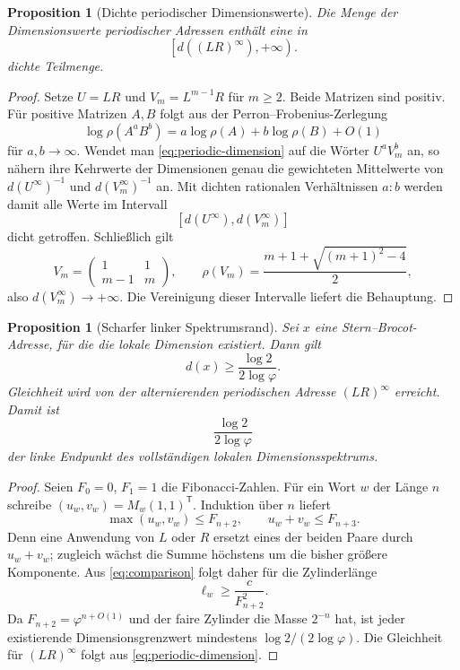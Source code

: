 \documentclass[11pt,a4paper]{article}
\newtheorem{proposition}[remark]{Proposition}
\begin{document}
\begin{proposition}[Dichte periodischer Dimensionswerte]
Die Menge der Dimensionswerte periodischer Adressen enthält eine in
\[
 \left[d((LR)^\infty),+\infty\right).
\]
dichte Teilmenge.
\end{proposition}

\begin{proof}
Setze $U=LR$ und $V_m=L^{m-1}R$ für $m\ge2$. Beide Matrizen sind positiv.
Für positive Matrizen $A,B$ folgt aus der Perron--Frobenius-Zerlegung
\[
 \log\rho(A^aB^b)
 =a\log\rho(A)+b\log\rho(B)+O(1)
\]
für $a,b\to\infty$. Wendet man \eqref{eq:periodic-dimension} auf die
Wörter $U^aV_m^b$ an, so nähern ihre Kehrwerte der Dimensionen genau die
gewichteten Mittelwerte von $d(U^\infty)^{-1}$ und
$d(V_m^\infty)^{-1}$ an. Mit dichten rationalen Verhältnissen $a:b$
werden damit alle Werte im Intervall
\[
 [d(U^\infty),d(V_m^\infty)]
\]
dicht getroffen. Schließlich gilt
\[
 V_m=\begin{pmatrix}1&1\\m-1&m\end{pmatrix},
 \qquad
 \rho(V_m)
 =\frac{m+1+\sqrt{(m+1)^2-4}}2,
\]
also $d(V_m^\infty)\to+\infty$. Die Vereinigung dieser Intervalle liefert
die Behauptung.
\end{proof}

\begin{proposition}[Scharfer linker Spektrumsrand]
Sei $x$ eine Stern--Brocot-Adresse, für die die lokale Dimension existiert.
Dann gilt
\[
 d(x)\ge \frac{\log2}{2\log\varphi}.
\]
Gleichheit wird von der alternierenden periodischen Adresse
$(LR)^\infty$ erreicht. Damit ist
\[
 \frac{\log2}{2\log\varphi}
\]
der linke Endpunkt des vollständigen lokalen Dimensionsspektrums.
\end{proposition}

\begin{proof}
Seien $F_0=0$, $F_1=1$ die Fibonacci-Zahlen. Für ein Wort $w$ der Länge
$n$ schreibe $(u_w,v_w)=M_w(1,1)^{\mathsf T}$. Induktion über $n$ liefert
\[
 \max(u_w,v_w)\le F_{n+2},
 \qquad
 u_w+v_w\le F_{n+3}.
\]
Denn eine Anwendung von $L$ oder $R$ ersetzt eines der beiden Paare durch
$u_w+v_w$; zugleich wächst die Summe höchstens um die bisher größere
Komponente. Aus \eqref{eq:comparison} folgt daher für die
Zylinderlänge
\[
 \ell_w\ge \frac{c}{F_{n+2}^2}.
\]
Da $F_{n+2}=\varphi^{n+O(1)}$ und der faire Zylinder die Masse $2^{-n}$
hat, ist jeder existierende Dimensionsgrenzwert mindestens
$\log2/(2\log\varphi)$. Die Gleichheit für $(LR)^\infty$ folgt aus
\eqref{eq:periodic-dimension}.
\end{proof}
\end{document}

